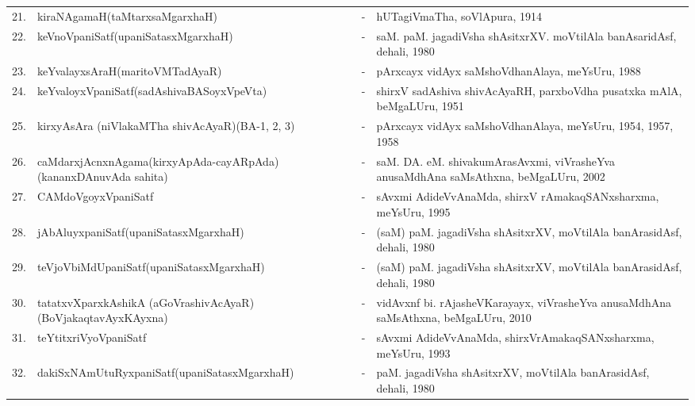 {\begin{longtable}{rp{6cm}cp{9cm}<{\raggedright}@{}}
21. & kiraNAgamaH\newline (taMtarxsaMgarxhaH) &-& hUTagiVmaTha, soVlApura, 1914\\
22. & keVnoVpaniSatf\newline (upaniSatasxMgarxhaH) &-& saM. paM. jagadiVsha shAsitxrXV. moVtilAla banAsaridAsf, dehali, 1980\\
23. & keYvalayxsAraH\newline (maritoVMTadAyaR) &-& pArxcayx vidAyx saMshoVdhanAlaya, meYsUru, 1988\\
24. & keYvaloyxVpaniSatf\newline (sadAshivaBASoyxVpeVta) &-& shirxV sadAshiva shivAcAyaRH, parxboVdha pusatxka mAlA, beMgaLUru, 1951\\
25. & kirxyAsAra (niVlakaMTha shivAcAyaR)\newline (BA-1, 2, 3) &-& pArxcayx vidAyx saMshoVdhanAlaya, meYsUru, 1954, 1957, 1958\\
26. & caMdarxjAcnxnAgama\newline (kirxyApAda-cayARpAda)\newline (kananxDAnuvAda sahita) &-& saM. DA. eM. shivakumArasAvxmi, viVrasheYva anusaMdhAna saMsAthxna, beMgaLUru, 2002\\
27. & CAMdoVgoyxVpaniSatf &-& sAvxmi AdideVvAnaMda, shirxV rAmakaqSANxsharxma, meYsUru, 1995\\
28. & jAbAluyxpaniSatf\newline (upaniSatasxMgarxhaH) &-& (saM) paM. jagadiVsha shAsitxrXV, moVtilAla banArasidAsf, dehali, 1980\\
29. & teVjoVbiMdUpaniSatf\newline (upaniSatasxMgarxhaH) &-& (saM) paM. jagadiVsha shAsitxrXV, moVtilAla banArasidAsf, dehali, 1980\\
30. & tatatxvXparxkAshikA (aGoVrashivAcAyaR)\newline (BoVjakaqtavAyxKAyxna) &-& vidAvxnf bi. rAjasheVKarayayx, viVrasheYva anusaMdhAna saMsAthxna, beMgaLUru, 2010\\
31. & teYtitxriVyoVpaniSatf &-& sAvxmi AdideVvAnaMda, shirxVrAmakaqSANxsharxma, meYsUru, 1993\\
32. & dakiSxNAmUtuRyxpaniSatf\newline (upaniSatasxMgarxhaH) &-& paM. jagadiVsha shAsitxrXV, moVtilAla banArasidAsf, dehali, 1980\\

\end{longtable}}
